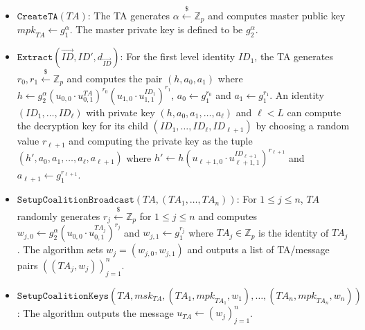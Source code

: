 \documentclass{llncs}
\newcommand{\Zbb}{\mathbb{Z}}
\newcommand{\ID}{\mathit{ID}}
\newcommand{\TA}{\mathit{TA}}
\newcommand{\mpk}{\mathit{mpk}}
\newcommand{\msk}{\mathit{msk}}
\newcommand{\getsr}{\stackrel{{\scriptscriptstyle\$}}{\gets}}
\begin{document}
\begin{itemize}
\item $\texttt{CreateTA}(\TA)$: The TA generates $\alpha \getsr \Zbb_{p}$ and computes master public key $\mpk_{\TA} \gets g_{1}^{\alpha}$. The master private key is defined to be $g_{2}^{\alpha}$.\medskip

\item $\texttt{Extract}(\vec{ID},\ID',d_{\vec{\ID}})$: For the first level identity $\ID_{1}$, the TA generates $r_{0},r_{1}\getsr \Zbb_{p}$ and computes the pair $(h,a_{0},a_{1})$ where $h\gets g_{2}^{\alpha}(u_{0,0} \cdot u_{0,1}^{\TA})^{r_{0}}(u_{1,0} \cdot u_{1,1}^{\ID_{1}})^{r_{1}}$, $a_{0}\gets g_{1}^{r_{0}}$ and $a_{1} \gets g_{1}^{r_{1}}$. An identity $(\ID_{1},\ldots,\ID_{\ell})$ with private key $(h,a_{0},a_{1},\ldots,a_{\ell})$ and $\ell < L$ can compute the decryption key for its child $(\ID_{1},\ldots,\ID_{\ell},\ID_{\ell+1})$ by choosing a random value $r_{\ell+1}$ and computing the private key as the tuple $(h',a_{0},a_{1},\ldots,a_{\ell},a_{\ell+1})$ where $h' \gets h(u_{\ell+1,0}\cdot u_{\ell+1,1}^{\ID_{\ell+1}})^{r_{\ell+1}}$ and $a_{\ell+1}\gets g_{1}^{r_{\ell+1}}$.\medskip

\item
$\texttt{SetupCoalitionBroadcast}(\TA,(\TA_{1},\ldots,\TA_{n}))$: For $1\leq j\leq n$, $\TA$ randomly generates $r_{j}\getsr \Zbb_{p}$ for $1\leq j\leq n$ and computes $w_{j,0} \gets g_{2}^\alpha(u_{0,0} \cdot u_{0,1}^{\TA_{j}})^{r_{j}}$ and $w_{j,1} \gets g_{1}^{r_{j}}$ where $\TA_{j} \in \Zbb_{p}$ is the identity of $\TA_{j}$. The algorithm sets $w_{j}=(w_{j,0},w_{j,1})$ and outputs a list of TA/message pairs $((\TA_{j},w_{j}))_{j=1}^{n}$. \medskip

\item $\texttt{SetupCoalitionKeys}(\TA,\msk_{\TA},(\TA_{1},\mpk_{\TA_{1}},w_{1}),\ldots,
(\TA_{n},\mpk_{\TA_{n}},w_{n}))$: The algorithm outputs the message $u_{\TA} \gets (w_{j})_{j=1}^{n}$. \medskip


\end{itemize}
\end{document}
